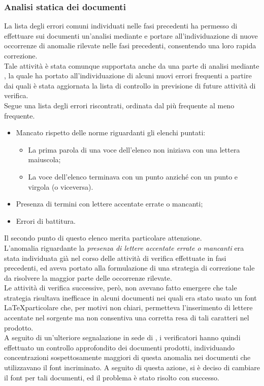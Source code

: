 \subsubsection{Analisi statica dei documenti}
La lista degli errori comuni individuati nelle fasi precedenti ha permesso di effettuare sui documenti un'analisi mediante  e portare all'individuazione di nuove occorrenze di anomalie rilevate nelle fasi precedenti, consentendo una loro rapida correzione.\\
Tale attività è stata comunque supportata anche da una parte di analisi mediante , la quale ha portato all'individuazione di alcuni nuovi errori frequenti a partire dai quali è stata aggiornata la lista di controllo in previsione di future attività di verifica. \\
Segue una lista degli errori riscontrati, ordinata dal più frequente al meno frequente.
\begin{itemize}
\item Mancato rispetto delle norme riguardanti gli elenchi puntati:
\begin{itemize}
\item La prima parola di una voce dell'elenco non iniziava con una lettera maiuscola;
\item La voce dell'elenco terminava con un punto anziché con un punto e virgola (o viceversa).
\end{itemize}
\item Presenza di termini con lettere accentate errate o mancanti;
\item Errori di battitura.
\end{itemize}
Il secondo punto di questo elenco merita particolare attenzione.\\
L'anomalia riguardante la \textit{presenza di lettere accentate errate o mancanti} era stata individuata già nel corso delle attività di verifica effettuate in fasi precedenti, ed aveva portato alla formulazione di una strategia di correzione tale da risolvere la maggior parte delle occorrenze rilevate.\\
Le attività di verifica successive, però, non avevano fatto emergere che tale strategia risultava inefficace in alcuni documenti nei quali era stato usato un font \LaTeX particolare che, per motivi non chiari, permetteva l'inserimento di lettere accentate nel sorgente ma non consentiva una corretta resa di tali caratteri nel  prodotto.\\
A seguito di un'ulteriore segnalazione in sede di \RP, i verificatori hanno quindi effettuato un controllo approfondito dei documenti prodotti, individuando concentrazioni sospettosamente maggiori di questa anomalia nei documenti che utilizzavano il font incriminato. A seguito di questa azione, si è deciso di cambiare il font per tali documenti, ed il problema è stato risolto con successo.
